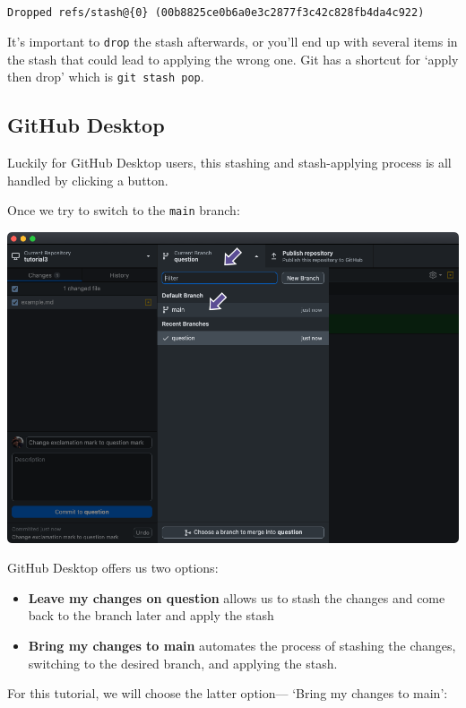 \documentclass[
  letterpaper,
  DIV=11,
  numbers=noendperiod]{scrartcl}
\begin{document}
\begin{verbatim}

Dropped refs/stash@{0} (00b8825ce0b6a0e3c2877f3c42c828fb4da4c922)
\end{verbatim}

It's important to \texttt{drop} the stash afterwards, or you'll end up
with several items in the stash that could lead to applying the wrong
one. Git has a shortcut for `apply then drop' which is
\texttt{git\ stash\ pop}.

\subsection{GitHub Desktop}

Luckily for GitHub Desktop users, this stashing and stash-applying
process is all handled by clicking a button.

Once we try to switch to the \texttt{main} branch:

\includegraphics{images/image39.png}

GitHub Desktop offers us two options:

\begin{itemize}
\item
  \textbf{Leave my changes on question} allows us to stash the changes
  and come back to the branch later and apply the stash
\item
  \textbf{Bring my changes to main} automates the process of stashing
  the changes, switching to the desired branch, and applying the stash.
\end{itemize}

For this tutorial, we will choose the latter option--- `Bring my changes
to main':
\end{document}
